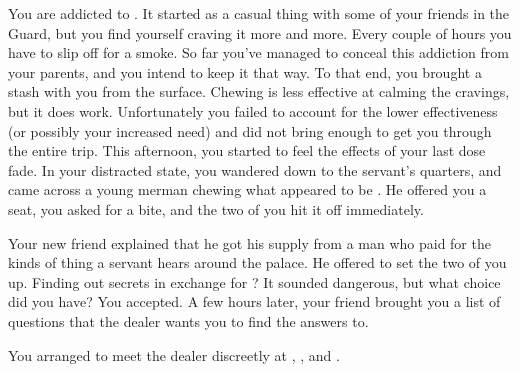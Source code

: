 \documentclass[green]{NeptuneBall}
\begin{document}
\name{\gAddicted{}}

You are addicted to \iDrug{}. It started as a casual thing with some of your friends in the Guard, but you find yourself craving it more and more. Every couple of hours you have to slip off for a smoke. So far you've managed to conceal this addiction from your parents, and you intend to keep it that way. To that end, you brought a stash with you from the surface. Chewing \iDrug{} is less effective at calming the cravings, but it does work. Unfortunately you failed to account for the lower effectiveness (or possibly your increased need) and did not bring enough to get you through the entire trip. This afternoon, you started to feel the effects of your last dose fade. In your distracted state, you wandered down to the servant's quarters, and came across a young merman chewing what appeared to be \iDrug{}. He offered you a seat, you asked for a bite, and the two of you hit it off immediately.

Your new friend explained that he got his supply from a man who paid for the kinds of thing a servant hears around the palace. He offered to set the two of you up. Finding out secrets in exchange for \iDrug{}? It sounded dangerous, but what choice did you have? You accepted. A few hours later, your friend brought you a list of questions that the dealer wants you to find the answers to.

You arranged to meet the dealer discreetly at \cTFifteen{\MYname{}}, \cTOneFifteen{\MYname{}}, \cTTwoFifteen{\MYname{}} and \cTThreeFifteen{\MYname{}}.
\end{document}
